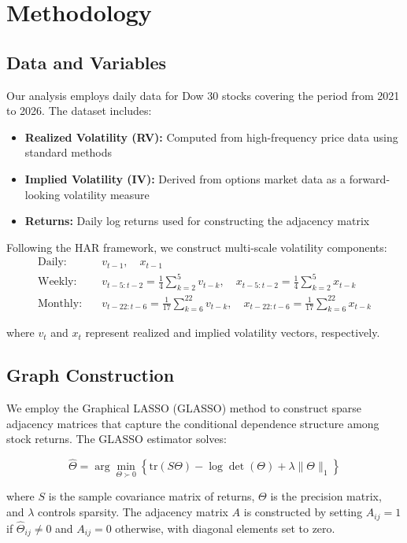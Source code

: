 \documentclass[12pt,a4paper]{article}
\begin{document}
\section{Methodology}

\subsection{Data and Variables}

Our analysis employs daily data for Dow 30 stocks covering the period from 2021 to 2026. The dataset includes:

\begin{itemize}
\item \textbf{Realized Volatility (RV):} Computed from high-frequency price data using standard methods
\item \textbf{Implied Volatility (IV):} Derived from options market data as a forward-looking volatility measure
\item \textbf{Returns:} Daily log returns used for constructing the adjacency matrix
\end{itemize}

Following the HAR framework, we construct multi-scale volatility components:
\begin{align}
\text{Daily:} \quad &v_{t-1}, \quad x_{t-1} \\
\text{Weekly:} \quad &v_{t-5:t-2} = \frac{1}{4}\sum_{k=2}^{5}v_{t-k}, \quad x_{t-5:t-2} = \frac{1}{4}\sum_{k=2}^{5}x_{t-k} \\
\text{Monthly:} \quad &v_{t-22:t-6} = \frac{1}{17}\sum_{k=6}^{22}v_{t-k}, \quad x_{t-22:t-6} = \frac{1}{17}\sum_{k=6}^{22}x_{t-k}
\end{align}

where $v_t$ and $x_t$ represent realized and implied volatility vectors, respectively.

\subsection{Graph Construction}

We employ the Graphical LASSO (GLASSO) method to construct sparse adjacency matrices that capture the conditional dependence structure among stock returns. The GLASSO estimator solves:

$$\hat{\Theta} = \arg\min_{\Theta \succ 0} \left\{ \text{tr}(S\Theta) - \log\det(\Theta) + \lambda \|\Theta\|_1 \right\}$$

where $S$ is the sample covariance matrix of returns, $\Theta$ is the precision matrix, and $\lambda$ controls sparsity. The adjacency matrix $A$ is constructed by setting $A_{ij} = 1$ if $\hat{\Theta}_{ij} \neq 0$ and $A_{ij} = 0$ otherwise, with diagonal elements set to zero.
\end{document}
